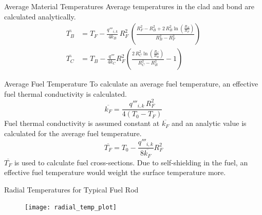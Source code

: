 \begin{frame}{Average Material Temperatures}
  Average temperatures in the clad and bond are calculated analytically.
  \begin{align}
    \label{eq:tb_bar}
    \overline{T_B} &= T_F - \frac{q'''_{i,k}}{4 k_B} \, R_F^2 \, \left(
      \frac{R_F^2 - R_B^2 + 2\,R_B^2 \ln\left(\frac{R_B}{R_F}\right)}
      {R_B^2-R_F^2}\right) \\
    \label{eq:tc_bar}
    \overline{T_C} &= T_B - \frac{q'''}{4 k_C} R_F^2 \left(
      \frac{2 \, R_C^2 \ln\left(\frac{R_C}{R_B}\right)}
      {R_C^2 - R_B^2}  - 1\right)
  \end{align}
\end{frame}

\begin{frame}{Average Fuel Temperature}
  To calculate an average fuel temperature, an effective fuel thermal
  conductivity is calculated.
  \begin{equation}
    \label{eq:kfuel_constant}
    \overline{k_F} = \frac{q'''_{i,k} \, R_F^2}{4(T_0-T_F)}
  \end{equation}
  Fuel thermal conductivity is assumed constant at $\overline{k_F}$ and an
  analytic value is calculated for the average fuel temperature.
  \begin{equation}
    \label{eq:tf_bar}
    \overline{T_F} = T_0 - \frac{q'''_{i,k}}{8 \overline{k_F}} R_F^2
  \end{equation}
  $\overline{T_F}$ is used to calculate fuel cross-sections. Due to
  self-shielding in the fuel, an effective fuel temperature would weight the
  surface temperature more.
\end{frame}

\begin{frame}{Radial Temperatures for Typical Fuel Rod}
  \begin{figure}
    \centering
    \texttt{[image: radial\_temp\_plot]}
    \label{fig:radial_temp_plot}
  \end{figure}
\end{frame}

